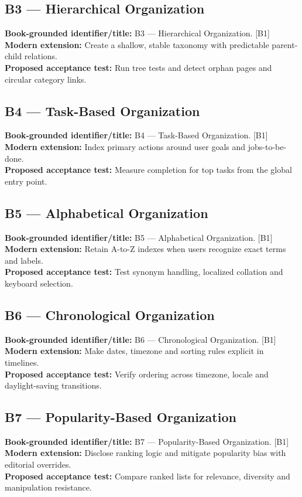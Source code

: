 \documentclass[11pt]{article}
\begin{document}
\subsection{B3 — Hierarchical Organization}
\noindent\textcolor{Ocean}{\textbf{Book-grounded identifier/title:}} B3 — Hierarchical Organization. [B1]\\
\textcolor{Mint}{\textbf{Modern extension:}} Create a shallow, stable taxonomy with predictable parent-child relations.\\
\textcolor{Amber}{\textbf{Proposed acceptance test:}} Run tree tests and detect orphan pages and circular category links.\medskip
\subsection{B4 — Task-Based Organization}
\noindent\textcolor{Ocean}{\textbf{Book-grounded identifier/title:}} B4 — Task-Based Organization. [B1]\\
\textcolor{Mint}{\textbf{Modern extension:}} Index primary actions around user goals and jobs-to-be-done.\\
\textcolor{Amber}{\textbf{Proposed acceptance test:}} Measure completion for top tasks from the global entry point.\medskip
\subsection{B5 — Alphabetical Organization}
\noindent\textcolor{Ocean}{\textbf{Book-grounded identifier/title:}} B5 — Alphabetical Organization. [B1]\\
\textcolor{Mint}{\textbf{Modern extension:}} Retain A-to-Z indexes when users recognize exact terms and labels.\\
\textcolor{Amber}{\textbf{Proposed acceptance test:}} Test synonym handling, localized collation and keyboard selection.\medskip
\subsection{B6 — Chronological Organization}
\noindent\textcolor{Ocean}{\textbf{Book-grounded identifier/title:}} B6 — Chronological Organization. [B1]\\
\textcolor{Mint}{\textbf{Modern extension:}} Make dates, timezone and sorting rules explicit in timelines.\\
\textcolor{Amber}{\textbf{Proposed acceptance test:}} Verify ordering across timezone, locale and daylight-saving transitions.\medskip
\subsection{B7 — Popularity-Based Organization}
\noindent\textcolor{Ocean}{\textbf{Book-grounded identifier/title:}} B7 — Popularity-Based Organization. [B1]\\
\textcolor{Mint}{\textbf{Modern extension:}} Disclose ranking logic and mitigate popularity bias with editorial overrides.\\
\textcolor{Amber}{\textbf{Proposed acceptance test:}} Compare ranked lists for relevance, diversity and manipulation resistance.\medskip
\end{document}
